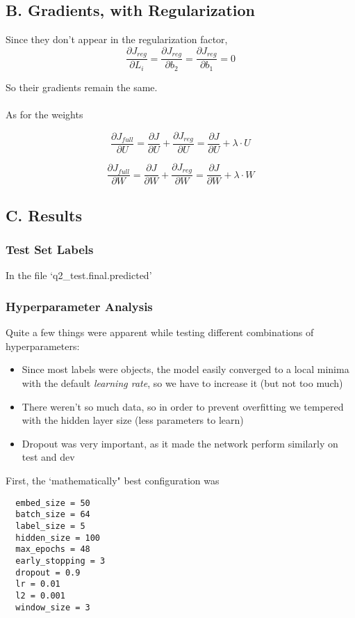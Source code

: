 \documentclass{article}
\begin{document}
\subsection*{B. Gradients, with Regularization}
Since they don't appear in the regularization factor,
$$
	\frac {\partial J_{reg}}{\partial L_i} = \frac {\partial J_{reg}}{\partial b_2}  = \frac {\partial J_{reg}}{\partial b_1}  = 0
$$

So their gradients remain the same. \\~\\
As for the weights

$$
	\frac {\partial J_{full}}{\partial U} = \frac {\partial J}{\partial U} + \frac {\partial J_{reg}}{\partial U} = \frac {\partial J}{\partial U} +  \lambda \cdot U
$$

$$
	\frac {\partial J_{full}}{\partial W} = \frac {\partial J}{\partial W} + \frac {\partial J_{reg}}{\partial W} = \frac {\partial J}{\partial W} +  \lambda \cdot W
$$

\subsection*{C. Results}
\subsubsection*{Test Set Labels}
In the file `q2\_test.final.predicted'

\subsubsection*{Hyperparameter Analysis}
Quite a few things were apparent while testing different combinations of hyperparameters:
\begin{itemize}
\item Since most labels were objects, the model easily converged to a local minima with the default \emph{learning rate}, so we have to increase it (but not too much)
\item There weren't so much data, so in order to prevent overfitting we tempered with the hidden layer size (less parameters to learn)
\item Dropout was very important, as it made the network perform similarly on test and dev
\end{itemize}

First, the `mathematically" best configuration was
\begin{lstlisting}
  embed_size = 50
  batch_size = 64
  label_size = 5
  hidden_size = 100
  max_epochs = 48
  early_stopping = 3
  dropout = 0.9
  lr = 0.01
  l2 = 0.001
  window_size = 3
\end{lstlisting}
\end{document}

